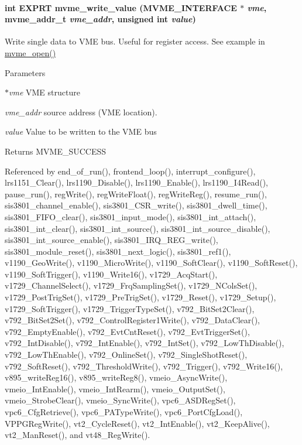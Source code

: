 \paragraph[{mvme\_\-write\_\-value}]{\setlength{\rightskip}{0pt plus 5cm}int EXPRT mvme\_\-write\_\-value ({\bf MVME\_\-INTERFACE} $\ast$ {\em vme}, \/  {\bf mvme\_\-addr\_\-t} {\em vme\_\-addr}, \/  unsigned int {\em value})}\hfill\label{group__mvmestdfunctionh_ga901e510ac4c207e424e944ee92c5ea65}
Write single data to VME bus. Useful for register access. See example in \hyperlink{group__mvmestdfunctionh_ga13db7fc7c7c022e46fadd8fc4dc40047}{mvme\_\-open()} 
\begin{DoxyParams}{Parameters}
\item[{\em $\ast$vme}]VME structure \item[{\em vme\_\-addr}]source address (VME location). \item[{\em value}]Value to be written to the VME bus \end{DoxyParams}
\begin{DoxyReturn}{Returns}
MVME\_\-SUCCESS 
\end{DoxyReturn}


Referenced by end\_\-of\_\-run(), frontend\_\-loop(), interrupt\_\-configure(), lrs1151\_\-Clear(), lrs1190\_\-Disable(), lrs1190\_\-Enable(), lrs1190\_\-I4Read(), pause\_\-run(), regWrite(), regWriteFloat(), regWriteReg(), resume\_\-run(), sis3801\_\-channel\_\-enable(), sis3801\_\-CSR\_\-write(), sis3801\_\-dwell\_\-time(), sis3801\_\-FIFO\_\-clear(), sis3801\_\-input\_\-mode(), sis3801\_\-int\_\-attach(), sis3801\_\-int\_\-clear(), sis3801\_\-int\_\-source(), sis3801\_\-int\_\-source\_\-disable(), sis3801\_\-int\_\-source\_\-enable(), sis3801\_\-IRQ\_\-REG\_\-write(), sis3801\_\-module\_\-reset(), sis3801\_\-next\_\-logic(), sis3801\_\-ref1(), v1190\_\-GeoWrite(), v1190\_\-MicroWrite(), v1190\_\-SoftClear(), v1190\_\-SoftReset(), v1190\_\-SoftTrigger(), v1190\_\-Write16(), v1729\_\-AcqStart(), v1729\_\-ChannelSelect(), v1729\_\-FrqSamplingSet(), v1729\_\-NColsSet(), v1729\_\-PostTrigSet(), v1729\_\-PreTrigSet(), v1729\_\-Reset(), v1729\_\-Setup(), v1729\_\-SoftTrigger(), v1729\_\-TriggerTypeSet(), v792\_\-BitSet2Clear(), v792\_\-BitSet2Set(), v792\_\-ControlRegister1Write(), v792\_\-DataClear(), v792\_\-EmptyEnable(), v792\_\-EvtCntReset(), v792\_\-EvtTriggerSet(), v792\_\-IntDisable(), v792\_\-IntEnable(), v792\_\-IntSet(), v792\_\-LowThDisable(), v792\_\-LowThEnable(), v792\_\-OnlineSet(), v792\_\-SingleShotReset(), v792\_\-SoftReset(), v792\_\-ThresholdWrite(), v792\_\-Trigger(), v792\_\-Write16(), v895\_\-writeReg16(), v895\_\-writeReg8(), vmeio\_\-AsyncWrite(), vmeio\_\-IntEnable(), vmeio\_\-IntRearm(), vmeio\_\-OutputSet(), vmeio\_\-StrobeClear(), vmeio\_\-SyncWrite(), vpc6\_\-ASDRegSet(), vpc6\_\-CfgRetrieve(), vpc6\_\-PATypeWrite(), vpc6\_\-PortCfgLoad(), VPPGRegWrite(), vt2\_\-CycleReset(), vt2\_\-IntEnable(), vt2\_\-KeepAlive(), vt2\_\-ManReset(), and vt48\_\-RegWrite().